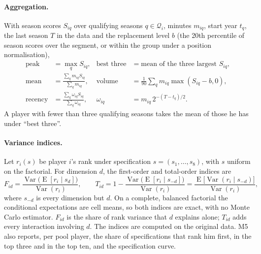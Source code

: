 \documentclass[11pt,a4paper]{article}
\DeclareMathOperator{\Var}{Var}
\DeclareMathOperator{\E}{E}
\begin{document}
\paragraph{Aggregation.}
With season scores $S_{iq}$ over qualifying seasons $q \in \mathcal Q_i$, minutes
$m_{iq}$, start year $t_q$, the last season $T$ in the data and the replacement
level $b$ (the 20th percentile of season scores over the segment, or within the
group under a position normalisation),
\begin{equation}
\begin{aligned}
  \text{peak} &= \max_{q} S_{iq}, &
  \text{best three} &= \text{mean of the three largest } S_{iq},\\
  \text{mean} &= \frac{\sum_q m_{iq} S_{iq}}{\sum_q m_{iq}}, &
  \text{volume} &= \frac{1}{90}\sum_q m_{iq} \max(S_{iq} - b, 0),\\
  \text{recency} &= \frac{\sum_q \omega_{iq} S_{iq}}{\sum_q \omega_{iq}}, &
  \omega_{iq} &= m_{iq}\, 2^{-(T - t_q)/2}.
\end{aligned}
\label{eq:aggregation}
\end{equation}
A player with fewer than three qualifying seasons takes the mean of those he
has under ``best three''.

\paragraph{Variance indices.}
Let $r_i(s)$ be player $i$'s rank under specification
$s = (s_1, \dots, s_8)$, with $s$ uniform on the factorial. For dimension $d$, the
first-order and total-order indices \citep{sobol2001sensitivity,homma1996importance,saltelli2010total}
are
\begin{equation}
  F_{id} = \frac{\Var\big(\E[r_i \mid s_d]\big)}{\Var(r_i)},
  \qquad
  T_{id} = 1 - \frac{\Var\big(\E[r_i \mid s_{-d}]\big)}{\Var(r_i)}
         = \frac{\E\big[\Var(r_i \mid s_{-d})\big]}{\Var(r_i)},
  \label{eq:sobol}
\end{equation}
where $s_{-d}$ is every dimension but $d$. On a complete, balanced factorial the
conditional expectations are cell means, so both indices are exact, with no
Monte Carlo estimator. $F_{id}$ is the share of rank variance that $d$ explains
alone; $T_{id}$ adds every interaction involving $d$. The indices are computed
on the original data. M5 also reports, per pool player, the share of
specifications that rank him first, in the top three and in the top ten, and
the specification curve.

\end{document}
